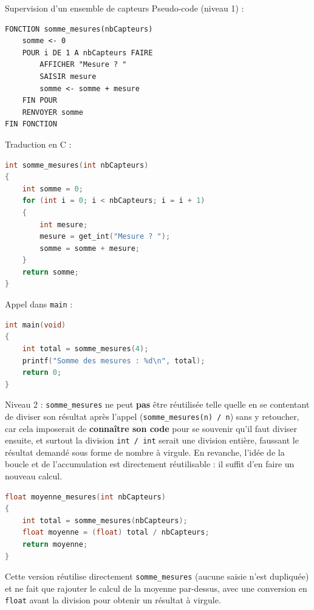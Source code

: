 \begin{UPSTIprofOnlyEnv}
    \begin{UPSTIcorrectionP}{Supervision d'un ensemble de capteurs}
        Pseudo-code (niveau 1) :
        \begin{verbatim}
FONCTION somme_mesures(nbCapteurs)
    somme <- 0
    POUR i DE 1 A nbCapteurs FAIRE
        AFFICHER "Mesure ? "
        SAISIR mesure
        somme <- somme + mesure
    FIN POUR
    RENVOYER somme
FIN FONCTION
        \end{verbatim}

        Traduction en C :
        \begin{lstlisting}[language=C]
int somme_mesures(int nbCapteurs)
{
    int somme = 0;
    for (int i = 0; i < nbCapteurs; i = i + 1)
    {
        int mesure;
        mesure = get_int("Mesure ? ");
        somme = somme + mesure;
    }
    return somme;
}
        \end{lstlisting}

        Appel dans \texttt{main} :
        \begin{lstlisting}[language=C]
int main(void)
{
    int total = somme_mesures(4);
    printf("Somme des mesures : %d\n", total);
    return 0;
}
        \end{lstlisting}

        Niveau 2 : \texttt{somme\_mesures} ne peut \textbf{pas} être réutilisée telle quelle en se contentant de diviser son résultat après l'appel (\texttt{somme\_mesures(n) / n}) sans y retoucher, car cela imposerait de \textbf{connaître son code} pour se souvenir qu'il faut diviser ensuite, et surtout la division \texttt{int / int} serait une division entière, faussant le résultat demandé sous forme de nombre à virgule. En revanche, l'idée de la boucle et de l'accumulation est directement réutilisable : il suffit d'en faire un nouveau calcul.
        \begin{lstlisting}[language=C]
float moyenne_mesures(int nbCapteurs)
{
    int total = somme_mesures(nbCapteurs);
    float moyenne = (float) total / nbCapteurs;
    return moyenne;
}
        \end{lstlisting}
        Cette version réutilise directement \texttt{somme\_mesures} (aucune saisie n'est dupliquée) et ne fait que rajouter le calcul de la moyenne par-dessus, avec une conversion en \texttt{float} avant la division pour obtenir un résultat à virgule.
    \end{UPSTIcorrectionP}
\end{UPSTIprofOnlyEnv}
